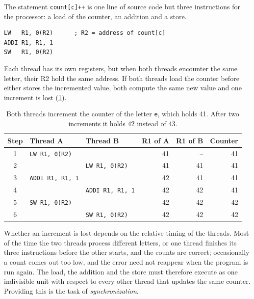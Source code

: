 \documentclass[../main.tex]{subfiles}
\begin{document}
The statement \texttt{count[c]++} is one line of source code but three
instructions for the processor: a load of the counter, an addition and a
store.
\begin{lstlisting}[language={[x86masm]Assembler}, numbers=none]
LW   R1, 0(R2)      ; R2 = address of count[c]
ADDI R1, R1, 1
SW   R1, 0(R2)
\end{lstlisting}
Each thread has its own registers, but when both threads encounter the same
letter, their R2 hold the same address.  If both threads load the counter
before either stores the incremented value, both compute the same new value
and one increment is lost (\cref{tab:l20-race}).

\begin{table}[htbp]
  \centering\small
  \caption{Both threads increment the counter of the letter \texttt{e},
    which holds 41.  After two increments it holds 42 instead of 43.}
  \label{tab:l20-race}
  \begin{tabular}{@{}cllrrr@{}}
    \toprule
    Step & Thread A & Thread B & R1 of A & R1 of B & Counter \\
    \midrule
    1 & \texttt{LW R1, 0(R2)}   &                             & 41 & --  & 41 \\
    2 &                         & \texttt{LW R1, 0(R2)}       & 41 & 41  & 41 \\
    3 & \texttt{ADDI R1, R1, 1} &                             & 42 & 41  & 41 \\
    4 &                         & \texttt{ADDI R1, R1, 1}     & 42 & 42  & 41 \\
    5 & \texttt{SW R1, 0(R2)}   &                             & 42 & 42  & 42 \\
    6 &                         & \texttt{SW R1, 0(R2)}       & 42 & 42  & 42 \\
    \bottomrule
  \end{tabular}
\end{table}

Whether an increment is lost depends on the relative timing of the threads.
Most of the time the two threads process different letters, or one thread
finishes its three instructions before the other starts, and the counts are
correct; occasionally a count comes out too low, and the error need not
reappear when the program is run again.  The load, the addition and the store must therefore execute as one
indivisible unit with respect to every other thread that updates the same
counter.  Providing this is the task of \emph{synchronization}.
\end{document}
